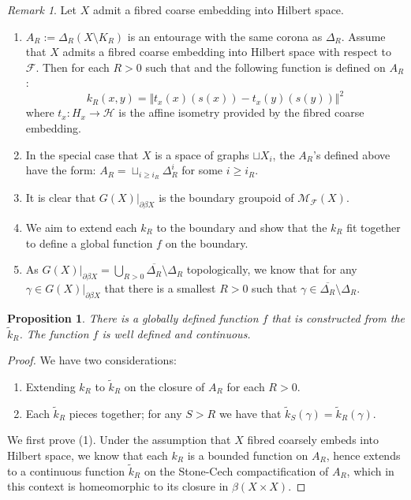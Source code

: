 \documentclass[11pt]{amsart}
\theoremstyle{plain}
\newtheorem{proposition}[theorem]{Proposition}%
\theoremstyle{definition}%
\theoremstyle{remark}%
\newtheorem{remark}[theorem]{Remark}%
\begin{document}
{\begin{remark}\label{rem:outline}
Let $X$ admit a fibred coarse embedding into Hilbert space.
\begin{enumerate}
\item $A_{R}:=\Delta_{R}(X\setminus K_{R})$ is an entourage with the same corona as $\Delta_{R}$. Assume that $X$ admits a fibred coarse embedding into Hilbert space with respect to $\mathcal{F}$. Then for each $R>0$ such that and the following function is defined on $A_{R}$:
\begin{equation*}
k_{R}(x,y)=\Vert t_{x}(x)(s(x))-t_{x}(y)(s(y))\Vert^{2}
\end{equation*}
where $t_{x}:H_{x} \rightarrow \mathcal{H}$ is the affine isometry provided by the fibred coarse embedding.
\item In the special case that $X$ is a space of graphs $\sqcup X_{i}$, the $A_{R}$'s defined above have the form: $A_{R}= \sqcup_{i\geq i_{R}}\Delta_{R}^{i}$ for some $i\geq i_{R}$.
\item It is clear that $G(X)|_{\partial\beta X}$ is the boundary groupoid of $\mathcal{M}_{\mathcal{F}}(X)$.
\item We aim to extend each $k_{R}$ to the boundary and show that the $k_{R}$ fit together to define a global function $f$ on the boundary.
\item As $G(X)|_{\partial\beta X} = \bigcup_{R>0} \overline{\Delta_{R}}\setminus \Delta_{R}$ topologically, we know that for any $\gamma \in G(X)|_{\partial\beta X}$ that there is a smallest $R>0$ such that $\gamma \in \overline{\Delta_{R}}\setminus \Delta_{R}$. 

\end{enumerate}
\end{remark}

\begin{proposition}\label{prop:wd}
There is a globally defined function $f$ that is constructed from the $\tilde{k}_{R}$. The function $f$ is well defined and continuous.
\end{proposition}
\begin{proof}
We have two considerations:
\begin{enumerate}
\item Extending $k_{R}$ to $\tilde{k}_{R}$ on the closure of $A_{R}$ for each $R>0$.
\item Each $\tilde{k}_{R}$ pieces together; for any $S>R$ we have that $\tilde{k}_{S}(\gamma)=\tilde{k}_{R}(\gamma)$.
\end{enumerate}
We first prove (1). Under the assumption that $X$ fibred coarsely embeds into Hilbert space, we know that each $k_{R}$ is a bounded function on $A_{R}$, hence extends to a continuous function $\tilde{k}_{R}$ on the Stone-Cech compactification of $A_{R}$, which in this context is homeomorphic to its closure in $\beta(X \times X)$. 


\end{proof}}
\end{document}
